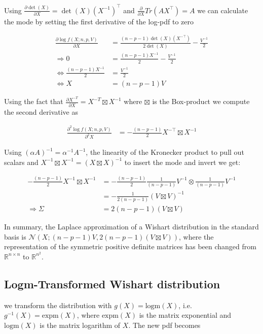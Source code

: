 Using $\frac{\partial \det(X)}{\partial X} = \det(X)(X^{-1})^\top$ and $\frac{\partial}{\partial X} Tr(AX^\top) = A$ we can calculate the mode by setting the first derivative of the log-pdf to zero

\begin{align*}
\frac{\partial \log f(X; n,p,V)}{\partial X} &= \frac{(n-p-1)\det(X)(X^{-\top})}{2\det(X)} - \frac{V^{-1}}{2} \\
\Rightarrow 0 &= \frac{(n-p-1)X^{-1}}{2} - \frac{V^{-1}}{2} \\
\Leftrightarrow  \frac{(n-p-1)X^{-1}}{2} &= \frac{V^{-1}}{2} \\
\Leftrightarrow X &= (n-p-1)V
\end{align*}

Using the fact that $\frac{\partial X^{-T}}{\partial X} = X^{-T} \boxtimes X^{-1}$ where $\boxtimes$ is the Box-product we compute the second derivative as

\begin{align*}
\frac{\partial^2 \log f(X; n,p,V)}{\partial^2 X} &= -\frac{(n-p-1)}{2} X^{-\top} \boxtimes X^{-1}
\end{align*}

Using $(\alpha A)^{-1} = \alpha^{-1}A^{-1}$, the linearity of the Kronecker product to pull out scalars and $X^{-1} \boxtimes X^{-1} = (X \boxtimes X)^{-1}$ to insert the mode and invert we get:

\begin{align*}
-\frac{(n-p-1)}{2} X^{-1} \boxtimes X^{-1} &= -\frac{(n-p-1)}{2} \frac{1}{(n-p-1)} V^{-1} \otimes \frac{1}{(n-p-1)} V^{-1} \\
&= -\frac{1}{2(n-p-1)}(V \boxtimes V)^{-1} \\
\Rightarrow \Sigma &= 2(n-p-1)(V \boxtimes V)
\end{align*}

In summary, the Laplace approximation of a Wishart distribution in the standard basis is $\mathcal{N}\left(X; (n-p-1)V, 2(n-p-1)(V \boxtimes V)\right)$, where the representation of the symmetric positive definite matrices has been changed from $\mathbb{R}^{n\times n}$ to $\mathbb{R}^{n^2}$.

\subsection{Logm-Transformed Wishart distribution}

we transform the distribution with $g(X) = \text{logm}(X)$, i.e. $g^{-1}(X) = \text{expm}(X)$, where $\text{expm}(X)$ is the matrix exponential and $\text{logm}(X)$ is the matrix logarithm of $X$. The new pdf becomes

